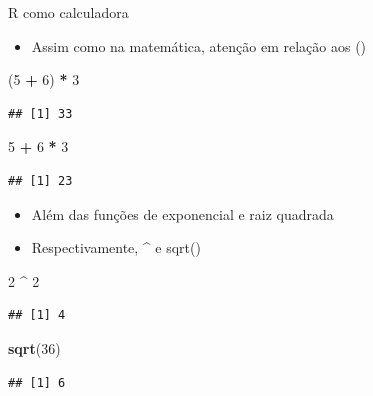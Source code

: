 \documentclass[
  10pt,
  ignorenonframetext,
]{beamer}
\newenvironment{Shaded}{\begin{snugshade}}{\end{snugshade}}
\newcommand{\DecValTok}[1]{\textcolor[rgb]{0.00,0.00,0.81}{#1}}
\newcommand{\KeywordTok}[1]{\textcolor[rgb]{0.13,0.29,0.53}{\textbf{#1}}}
\newcommand{\NormalTok}[1]{#1}
\newcommand{\OperatorTok}[1]{\textcolor[rgb]{0.81,0.36,0.00}{\textbf{#1}}}
\newcommand{\StringTok}[1]{\textcolor[rgb]{0.31,0.60,0.02}{#1}}
\providecommand{\tightlist}{%
  \setlength{\itemsep}{0pt}\setlength{\parskip}{0pt}}
\begin{document}
\begin{frame}[fragile]{R como calculadora}
\protect\hypertarget{r-como-calculadora-1}{}
\begin{itemize}
\tightlist
\item
  Assim como na matemática, atenção em relação aos ()
\end{itemize}

\begin{Shaded}
\begin{Highlighting}[]
\NormalTok{(}\DecValTok{5} \OperatorTok{+}\StringTok{ }\DecValTok{6}\NormalTok{) }\OperatorTok{*}\StringTok{ }\DecValTok{3}
\end{Highlighting}
\end{Shaded}

\begin{verbatim}
## [1] 33
\end{verbatim}

\begin{Shaded}
\begin{Highlighting}[]
\DecValTok{5} \OperatorTok{+}\StringTok{ }\DecValTok{6} \OperatorTok{*}\StringTok{ }\DecValTok{3}
\end{Highlighting}
\end{Shaded}

\begin{verbatim}
## [1] 23
\end{verbatim}

\begin{itemize}
\item
  Além das funções de exponencial e raiz quadrada
\item
  Respectivamente, \^{} e sqrt()
\end{itemize}

\begin{Shaded}
\begin{Highlighting}[]
\DecValTok{2} \OperatorTok{\^{}}\StringTok{ }\DecValTok{2}
\end{Highlighting}
\end{Shaded}

\begin{verbatim}
## [1] 4
\end{verbatim}

\begin{Shaded}
\begin{Highlighting}[]
\KeywordTok{sqrt}\NormalTok{(}\DecValTok{36}\NormalTok{)}
\end{Highlighting}
\end{Shaded}

\begin{verbatim}
## [1] 6
\end{verbatim}
\end{frame}
\end{document}
